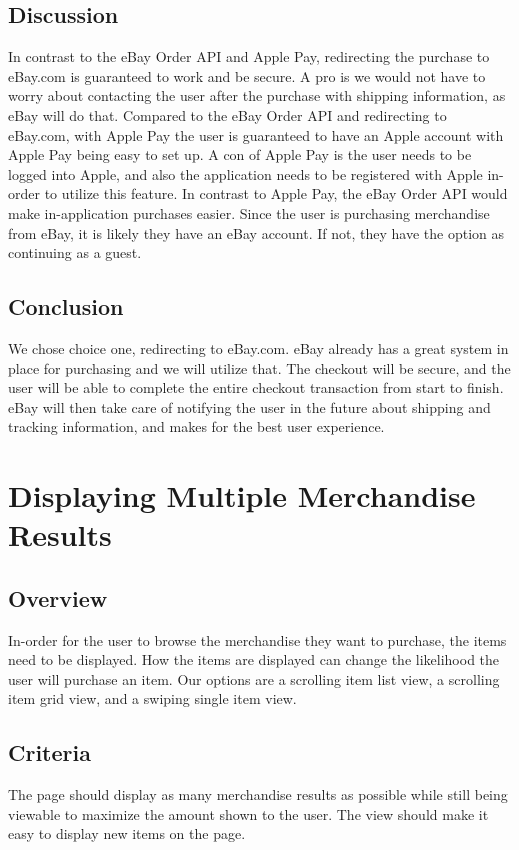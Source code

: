 \documentclass[onecolumn, draftclsnofoot,10pt, compsoc]{IEEEtran}
\begin{document}
\subsection{Discussion}
In contrast to the eBay Order API and Apple Pay, redirecting the purchase to eBay.com is guaranteed to work and be secure. A pro is we would not have to worry about contacting the user after the purchase with shipping information, as eBay will do that. Compared to the eBay Order API and redirecting to eBay.com, with Apple Pay the user is guaranteed to have an Apple account with Apple Pay being easy to set up. A con of Apple Pay is the user needs to be logged into Apple, and also the application needs to be registered with Apple in-order to utilize this feature. In contrast to Apple Pay, the eBay Order API would make in-application purchases easier. Since the user is purchasing merchandise from eBay, it is likely they have an eBay account. If not, they have the option as continuing as a guest.

\subsection{Conclusion}
We chose choice one, redirecting to eBay.com. eBay already has a great system in place for purchasing and we will utilize that. The checkout will be secure, and the user will be able to complete the entire checkout transaction from start to finish. eBay will then take care of notifying the user in the future about shipping and tracking information, and makes for the best user experience.


\section{Displaying Multiple Merchandise Results}

\subsection{Overview}
In-order for the user to browse the merchandise they want to purchase, the items need to be displayed. How the items are displayed can change the likelihood the user will purchase an item. Our options are a scrolling item list view, a scrolling item grid view, and a swiping single item view.

\subsection{Criteria}
The page should display as many merchandise results as possible while still being viewable to maximize the amount shown to the user. The view should make it easy to display new items on the page. 
\end{document}
